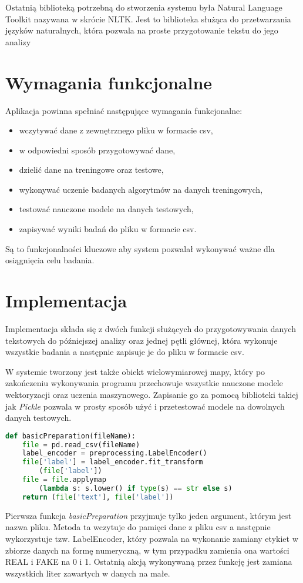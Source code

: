 Ostatnią biblioteką potrzebną do stworzenia systemu była Natural Language Toolkit nazywana w skrócie 
NLTK. Jest to biblioteka służąca do przetwarzania języków naturalnych, która pozwala na proste przygotowanie tekstu do jego analizy
\section{Wymagania funkcjonalne}
Aplikacja powinna spełniać następujące wymagania funkcjonalne: 
\begin{itemize}
    \item wczytywać dane z zewnętrznego pliku w formacie csv,
    \item w odpowiedni sposób przygotowywać dane,
    \item dzielić dane na treningowe oraz testowe,
    \item wykonywać uczenie badanych algorytmów na danych treningowych,
    \item testować nauczone modele na danych testowych,
    \item zapisywać wyniki badań do pliku w formacie csv.
\end{itemize}
Są to funkcjonalności kluczowe aby system pozwalał wykonywać ważne dla osiągnięcia celu
badania. 
\section{Implementacja}
Implementacja składa się z dwóch funkcji służących do przygotowywania danych tekstowych
do późniejszej analizy oraz jednej pętli głównej, która wykonuje wszystkie badania
a następnie zapisuje je do pliku w formacie csv. 

W systemie tworzony jest także obiekt
wielowymiarowej mapy, który po zakończeniu wykonywania programu przechowuje
wszystkie nauczone modele wektoryzacji oraz uczenia maszynowego. Zapisanie go za pomocą
biblioteki takiej jak \textit{Pickle} pozwala
w prosty sposób użyć i przetestować modele na dowolnych danych testowych. 


\begin{lstlisting}[language=Python, caption={Funkcja przygotowywująca dane pobrane z pliku csv}, captionpos=b, frame=single]
def basicPreparation(fileName): 
    file = pd.read_csv(fileName)
    label_encoder = preprocessing.LabelEncoder()
    file['label'] = label_encoder.fit_transform
        (file['label']) 
    file = file.applymap
        (lambda s: s.lower() if type(s) == str else s) 
    return (file['text'], file['label'])
\end{lstlisting}
Pierwsza funkcja \textit{basicPreparation} przyjmuje tylko jeden argument, którym jest
nazwa pliku. Metoda ta wczytuje do pamięci dane z pliku csv a następnie wykorzystuje
tzw. LabelEncoder, który pozwala na wykonanie zamiany etykiet w zbiorze danych na formę
numeryczną, w tym przypadku zamienia ona wartości REAL i FAKE na 0 i 1. Ostatnią 
akcją wykonywaną przez funkcję jest zamiana wszystkich liter zawartych w danych na małe.

